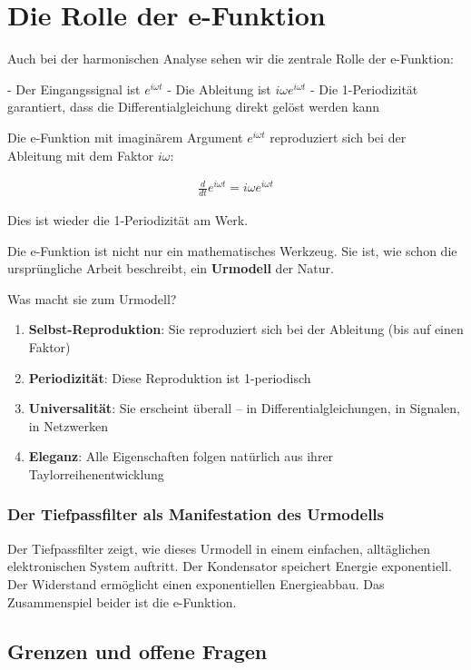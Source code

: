 \documentclass[a4paper,12pt,twoside]{report}
\theoremstyle{definition}
\begin{document}
\section{Die Rolle der e-Funktion}

Auch bei der harmonischen Analyse sehen wir die zentrale Rolle der e-Funktion:

- Der Eingangssignal ist $e^{i\omega t}$
- Die Ableitung ist $i\omega e^{i\omega t}$
- Die 1-Periodizität garantiert, dass die Differentialgleichung direkt gelöst werden kann

Die e-Funktion mit imaginärem Argument $e^{i\omega t}$ reproduziert sich bei der Ableitung mit dem Faktor $i\omega$:

\begin{align}
	\frac{d}{dt} e^{i\omega t} = i\omega e^{i\omega t}
\end{align}

Dies ist wieder die 1-Periodizität am Werk.

Die e-Funktion ist nicht nur ein mathematisches Werkzeug. Sie ist, wie schon die ursprüngliche Arbeit beschreibt, ein \textbf{Urmodell} der Natur.

Was macht sie zum Urmodell?

\begin{enumerate}
	\item \textbf{Selbst-Reproduktion}: Sie reproduziert sich bei der Ableitung (bis auf einen Faktor)
	\item \textbf{Periodizität}: Diese Reproduktion ist 1-periodisch
	\item \textbf{Universalität}: Sie erscheint überall -- in Differentialgleichungen, in Signalen, in Netzwerken
	\item \textbf{Eleganz}: Alle Eigenschaften folgen natürlich aus ihrer Taylorreihenentwicklung
\end{enumerate}

\subsubsection*{Der Tiefpassfilter als Manifestation des Urmodells}

Der Tiefpassfilter zeigt, wie dieses Urmodell in einem einfachen, alltäglichen elektronischen System auftritt. Der Kondensator speichert Energie exponentiell. Der Widerstand ermöglicht einen exponentiellen Energieabbau. Das Zusammenspiel beider ist die e-Funktion.

\subsection{Grenzen und offene Fragen}
\end{document}
